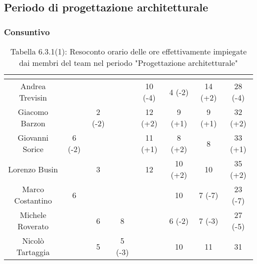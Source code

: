 \subsection{Periodo di progettazione architetturale}
\subsubsection{Consuntivo}
\renewcommand{\arraystretch}{1.5}
\begin{table}[H]
\begin{center}
\begin{tabular}{|c|c|c|c|c|c|c|c|}
\hline
\rowcolor{title_row}
\textbf{\color{title_text}{Nome}} & \textbf{\color{title_text}{Resp.}} & \textbf{\color{title_text}{Ammi.}} & \textbf{\color{title_text}{Analist.}} & \textbf{\color{title_text}{Progett.}} & \textbf{\color{title_text}{Program.}} & \textbf{\color{title_text}{Verific.}} & \textbf{\color{title_text}{Totale}} \\ \hline
Andrea Trevisin  & & & & 10 (-4) & 4 (-2) & 14 (+2) & 28 (-4) \\ \hline     %
Giacomo Barzon   & & 2 (-2) & & 12 (+2) & 9 (+1) & 9 (+1) & 32 (+2)  \\ \hline
Giovanni Sorice  & 6 (-2) & & & 11 (+1) & 8 (+2) & 8 & 33 (+1)  \\ \hline
Lorenzo Busin    & & 3 & & 12 & 10 (+2) & 10 & 35 (+2) \\ \hline
Marco Costantino & 6 & & & & 10 & 7 (-7) & 23 (-7) \\ \hline     %
Michele Roverato & & 6 & 8 & & 6 (-2) & 7 (-3) & 27 (-5) \\ \hline    %
Nicolò Tartaggia & & 5 & 5 (-3) & & 10 & 11 & 31  \\ \hline
\end{tabular}
\caption{Tabella 6.3.1(1): Resoconto orario delle ore effettivamente impiegate dai membri del team nel periodo "Progettazione architetturale"\label{}}
\end{center}
\end{table}
\renewcommand{\arraystretch}{1}

